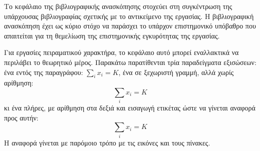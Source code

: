 Το κεφάλαιο της βιβλιογραφικής ανασκόπησης στοχεύει στη συγκέντρωση
της υπάρχουσας βιβλιογραφίας σχετικής με το αντικείμενο της εργασίας.
Η βιβλιογραφική ανασκόπηση έχει ως κύριο στόχο να παράσχει το υπάρχον
επιστημονικό υπόβαθρο που απαιτείται για τη θεμελίωση της επιστημονικής
εγκυρότητας της εργασίας.

Για εργασίες πειραματικού χαρακτήρα, το κεφάλαιο αυτό μπορεί εναλλακτικά
να περιλάβει το θεωρητικό μέρος. Παρακάτω παρατίθενται τρία παραδείγματα
εξισώσεων: ένα εντός της παραγράφου: $\sum_i x_i = K$, ένα σε ξεχωριστή γραμμή,
αλλά χωρίς αρίθμηση:
\[
\sum_i x_i=K
\]
κι ένα πλήρες, με αρίθμηση στα δεξιά και εισαγωγή ετικέτας ώστε να γίνεται
αναφορά προς αυτήν:
\begin{equation}
\label{eq:example}
	\sum_i x_i = K
\end{equation}
Η αναφορά γίνεται με παρόμοιο τρόπο με τις εικόνες και τους πίνακες.

